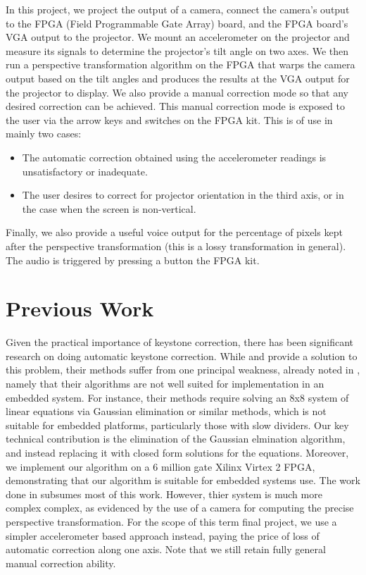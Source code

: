 \documentclass{article}
\begin{document}
In this project, we project the output of a camera, connect the camera's output to the FPGA (Field Programmable Gate Array) board,
and the FPGA board's VGA output to the projector.
We mount an accelerometer on the projector and measure its signals to determine the projector's tilt angle on two axes.
We then run a perspective transformation algorithm on the FPGA that warps the camera output based on the tilt angles and produces the results at the VGA output for the projector to display.
We also provide a manual correction mode so that any desired correction can be achieved.
This manual correction mode is exposed to the user via the arrow keys and switches on the FPGA kit.
This is of use in mainly two cases:
\begin{itemize}
\item The automatic correction obtained using the accelerometer readings is unsatisfactory or inadequate.
\item The user desires to correct for projector orientation in the third axis, or in the case when the screen is non-vertical.
\end{itemize}
Finally, we also provide a useful voice output for the percentage of pixels kept after the perspective transformation (this is a lossy transformation in general).
The audio is triggered by pressing a button the FPGA kit.


\section{Previous Work}
Given the practical importance of keystone correction, there has been significant research on doing automatic keystone correction.
While \citet{raskar2001self} and \citet{sukthankar2001smarter} provide a solution to this problem, their methods suffer from one principal weakness,
already noted in \citet{baoxin2004automatic}, namely that their algorithms are not well suited for implementation in an embedded system.
For instance, their methods require solving an 8x8 system of linear equations via Gaussian elimination or similar methods,
which is not suitable for embedded platforms, particularly those with slow dividers.
Our key technical contribution is the elimination of the Gaussian elmination algorithm,
and instead replacing it with closed form solutions for the equations.
Moreover, we implement our algorithm on a 6 million gate Xilinx Virtex 2 FPGA, demonstrating that our algorithm is suitable for embedded systems use.
The work done in \citet{baoxin2004automatic} subsumes most of this work.
However, thier system is much more complex complex, as evidenced by the use of a camera for computing the precise perspective transformation.
For the scope of this term final project,
we use a simpler accelerometer based approach instead, paying the price of loss of automatic correction along one axis.
Note that we still retain fully general manual correction ability.
\end{document}
